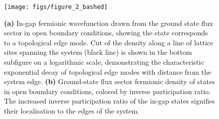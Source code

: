 \documentclass[%
 reprint,
superscriptaddress,
 amsmath,amssymb,
aps,
]{revtex4-2}
\begin{document}
\begin{figure}
    \centering
    \texttt{[image: figs/figure\_2\_bashed]}
    \caption{\textbf{(a)} In-gap fermionic wavefunction drawn from the ground state flux sector in open boundary conditions, showing the state corresponds to a topological edge mode. Cut of the density along a line of lattice sites spanning the system (black line) is shown in the bottom subfigure on a logarithmic scale, demonstrating the characteristic exponential decay of topological edge modes with distance from the system edge. \textbf{(b)} Ground-state flux sector fermionic density of states in open boundary conditions, colored by inverse participation ratio. The increased inverse participation ratio of the in-gap states signifies their localisation to the edges of the system.}
    \label{fig:edge_modes}
\end{figure}
\end{document}
